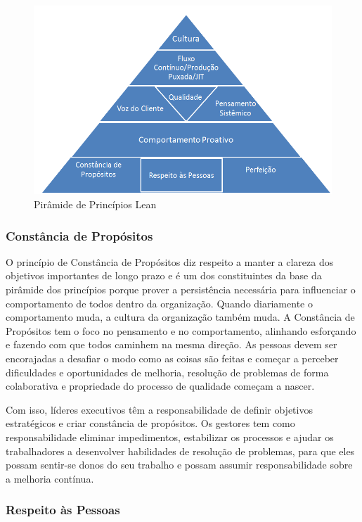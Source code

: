 \begin{figure}[h]
		\centering
		\label{fig01}
			\includegraphics[scale=0.7]{figuras/principioslean.png}
		\caption{Pirâmide de Princípios Lean}
\end{figure}

\subsubsection[Constância de Propósitos]{Constância de Propósitos}

O princípio de Constância de Propósitos diz respeito a manter a clareza dos objetivos importantes de longo prazo e é um dos constituintes da base da pirâmide dos princípios porque prover a persistência necessária para influenciar o comportamento de todos dentro da organização. Quando diariamente o comportamento muda, a cultura da organização também muda. A Constância de Propósitos tem o foco no pensamento e no comportamento, alinhando esforçando e fazendo com que todos caminhem na mesma direção. As pessoas devem ser encorajadas a desafiar o modo como as coisas são feitas e começar a perceber dificuldades e oportunidades de melhoria, resolução de problemas de forma colaborativa e propriedade do processo de qualidade começam a nascer.

Com isso, líderes executivos têm a responsabilidade de definir objetivos estratégicos e criar constância de propósitos. Os gestores tem como responsabilidade eliminar impedimentos, estabilizar os processos e ajudar os trabalhadores a desenvolver habilidades de resolução de problemas, para que eles possam sentir-se donos do seu trabalho e possam assumir responsabilidade sobre a melhoria contínua. 


\subsubsection[Respeito às Pessoas]{Respeito às Pessoas}

